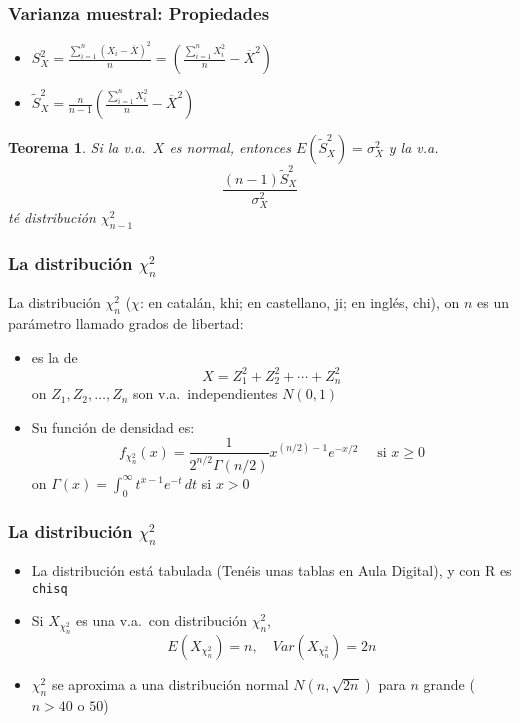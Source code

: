 \documentclass[12pt,t]{beamer}\usepackage[]{graphicx}\usepackage[]{color}
\renewcommand{\emph}[1]{{\color{red}#1}}
\renewcommand{\geq}{\geqslant}
\theoremstyle{plain}
\newtheorem{teorema}{Teorema}
\theoremstyle{definition}
\begin{document}
\begin{frame}
\frametitle{Varianza muestral: Propiedades}
\begin{itemize}
\item $\displaystyle S^2_X=\frac{\sum_{i=1}^n (X_{i}-\overline{X})^2}{n}=\left(\frac{\sum_{i=1}^n
X_{i}^2}{n}-\overline{X}^2\right)$\medskip

\item $\displaystyle \widetilde{S}_{X}^2=\frac{n}{n-1}\left(\frac{\sum_{i=1}^n
X_{i}^2}{n}-\overline{X}^2\right)$\medskip

\end{itemize}


\begin{teorema}
Si la v.a.\ $X$ es normal, entonces $E(\widetilde{S}_{X}^2)=\sigma_{X}^2$ y 
la v.a.
$$
\frac{(n-1)\widetilde{S}_{X}^2}{\sigma_{X}^2}
$$
té distribución $\chi_{n-1}^2$
\end{teorema}
\end{frame}


\begin{frame}
\frametitle{La distribución $\chi_n^2$}

La distribución $\chi_n^2$ ($\chi$: en catalán, \emph{khi}; en castellano, \emph{ji}; en inglés, \emph{chi}), on $n$  es un parámetro llamado  \emph{grados de libertad}:
\begin{itemize}
\item es la de 
$$
X=Z_{1}^{2}+Z_{2}^{2}+\cdots +Z_{n}^{2}
$$ 
on  $Z_{1},Z_{2},\ldots, Z_{n}$ son v.a.\  independientes  $N(0,1)$
\medskip

\item Su función de densidad es:
$$
f_{\chi_n^2}(x)={\frac{1}{2^{n/2} \Gamma (n/2)}} x^{(n/2)-1} e^{-x/2}\quad\mbox{ si $x\geq 0$}
$$
on $\Gamma(x)=\int_{0}^{\infty} t^{x-1}e^{-t}\, dt$ si $x> 0$

\end{itemize}
\end{frame}


\begin{frame}
\frametitle{La distribución $\chi_n^2$}

\begin{itemize}
\item La distribución está tabulada (\emph{Tenéis unas tablas en Aula Digital}), y con R es \texttt{chisq}
\bigskip

\item Si $X_{\chi_n^2}$ es una v.a.\ con distribución  $\chi_n^2$,
$$E(X_{\chi_n^2})=n,\quad Var(X_{\chi_n^2})=2 n$$
\medskip

\item ${\chi_n^2}$ se aproxima a una distribución normal $N(n,\sqrt{2n})$ para  $n$ grande
($n>40$ o $50$) 
\end{itemize}

\end{frame}
\end{document}
